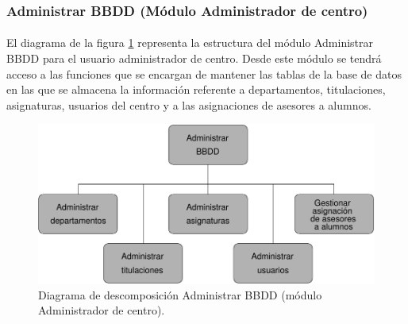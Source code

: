 \subsubsection{Administrar BBDD (Módulo Administrador de centro)}

  \paragraph{}El diagrama de la figura
  \ref{diagramaDescomposicionAdministrarBBDD-admCentro} representa la estructura
  del módulo Administrar BBDD para el usuario administrador de centro. Desde
  este módulo se tendrá acceso a las funciones que se encargan de mantener las
  tablas de la base de datos en las que se almacena la información referente a
  departamentos, titulaciones, asignaturas, usuarios del centro y a las
  asignaciones de asesores a alumnos.

  \begin{figure}[!ht]
    \begin{center}
      \includegraphics[]{11.Disenyo_Arquitectonico/11.2.Diagramas_Descomposicion/11.2.3.Modulo_administrador_centro/AdministrarBBDD/Diagramas/administrar_bbdd.pdf}
      \caption{Diagrama de descomposición Administrar BBDD (módulo Administrador de centro).}
      \label{diagramaDescomposicionAdministrarBBDD-admCentro}
    \end{center}
  \end{figure}

 
 
 
 
  